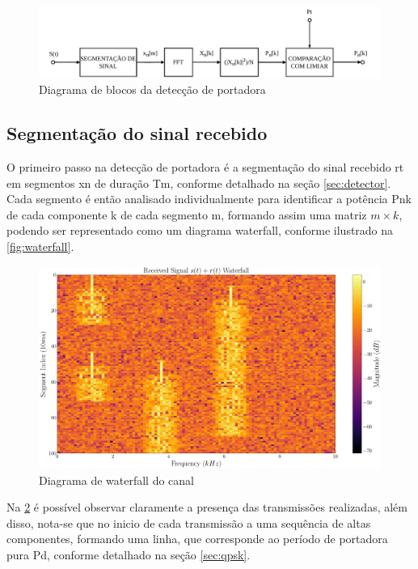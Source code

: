 \begin{figure}[H]
	\centering
	\caption{Diagrama de blocos da detecção de portadora}\label{fig:detector_diagram}
	\includegraphics[width=\linewidth]{assets/diagrams/detector.pdf}
\end{figure}

\subsection{Segmentação do sinal recebido}\label{sec:segmentacao}

O primeiro passo na detecção de portadora é a segmentação do sinal recebido \gls{rt} em segmentos \gls{xn} de duração \gls{Tm}, conforme detalhado na seção \ref{sec:detector}. Cada segmento é então analisado individualmente para identificar a potência \gls{Pnk} de cada componente \gls{k} de cada segmento \gls{m}, formando assim uma matriz $m \times k$, podendo ser representado como um diagrama waterfall, conforme ilustrado na \autoref{fig:waterfall}.

\begin{figure}[H]
	\centering
	\caption{Diagrama de waterfall do canal}\label{fig:waterfall}
	\includegraphics[width=\linewidth]{assets/cap3/example_detector_waterfall.pdf}
\end{figure}

Na \ref{fig:waterfall} é possível observar claramente a presença das transmissões realizadas, além disso, nota-se que no inicio de cada transmissão a uma sequência de altas componentes, formando uma linha, que corresponde ao período de portadora pura \gls{Pd}, conforme detalhado na seção \ref{sec:qpsk}.

